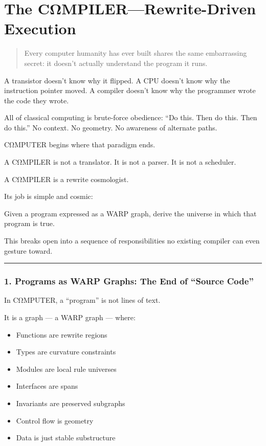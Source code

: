 \chapter{The CΩMPILER---Rewrite-Driven Execution}\label{the-cux3c9mpiler-rewrite-driven-execution}

\begin{quote}
Every computer humanity has ever built shares the same embarrassing
secret: it doesn't actually understand the program it runs.
\end{quote}

A transistor doesn't know why it flipped. A CPU doesn't know why the
instruction pointer moved. A compiler doesn't know why the programmer
wrote the code they wrote.

All of classical computing is brute-force obedience: ``Do this. Then do
this. Then do this.'' No context. No geometry. No awareness of alternate
paths.

CΩMPUTER begins where that paradigm ends.

A CΩMPILER is not a translator. It is not a parser. It is not a
scheduler.

A CΩMPILER is a rewrite cosmologist.

Its job is simple and cosmic:

Given a program expressed as a WARP graph, derive the universe in which that
program is true.

This breaks open into a sequence of responsibilities no existing
compiler can even gesture toward.

\begin{center}\rule{0.5\linewidth}{0.5pt}\end{center}

\subsection{1. Programs as WARP Graphs: The End of ``Source
Code''}\label{programs-as-rmgs-the-end-of-source-code}

In CΩMPUTER, a ``program'' is not lines of text.

It is a graph --- a WARP graph --- where:

\begin{itemize}
\tightlist
\item
  Functions are rewrite regions
\item
  Types are curvature constraints
\item
  Modules are local rule universes
\item
  Interfaces are spans
\item
  Invariants are preserved subgraphs
\item
  Control flow is geometry
\item
  Data is just stable substructure
\end{itemize}

